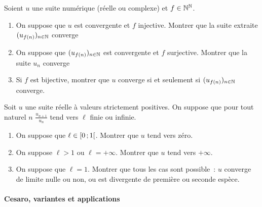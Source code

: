         \begin{exercice}
          Soient \(u\) une suite numérique (réelle ou complexe) et \(f \in 
          \mathbb{N}^{\mathbb{N}}\).
          \begin{enumerate}
            \item On suppose que \(u\) est convergente et \(f\) injective. 
              Montrer que la suite extraite \((u_{f(n)})_{n \in \mathbb{N}}\) converge
            \item On suppose que \((u_{f(n)})_{n \in \mathbb{N}}\) est convergente et 
              \(f\) surjective. Montrer que la suite \(u_n\) converge
            \item Si \(f\) est bijective, montrer que \(u\) converge si et 
              seulement si \((u_{f(n)})_{n \in \mathbb{N}}\) converge.
          \end{enumerate}
        \end{exercice}
        \begin{exercice}
          Soit \(u\) une suite réelle à valeurs strictement positives. On 
          suppose que pour tout naturel \(n\) \(\frac{u_{n+1}}{u_n}\) tend vers 
          \(\ell\) finie ou infinie.
          \begin{enumerate}
            \item On suppose que \(\ell \in \left[ 0 \, ;  1 \right[\). Montrer que 
              \(u\) tend vers zéro.
            \item On suppose \(\ell > 1\) ou \(\ell = +\infty\). Montrer que 
              \(u\) tend vers \(+\infty\).
            \item On suppose que \(\ell = 1\). Montrer que tous les cas sont 
              possible~: \(u\) converge de limite nulle ou non, ou est 
              divergente de première ou seconde espèce.
          \end{enumerate}
        \end{exercice}
        \paragraph{Cesaro, variantes et applications}
        ~~

